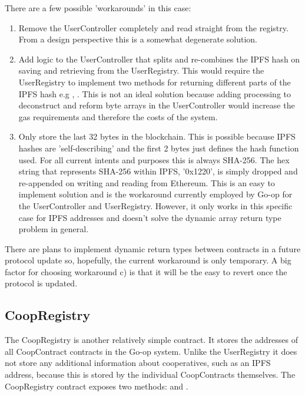 There are a few possible 'workarounds' in this case:\\

\begin{enumerate}[label=(\alph*)]
\item Remove the UserController completely and read straight from the registry. From a design perspective this is a somewhat degenerate solution. \\

\item Add logic to the UserController that splits and re-combines the IPFS hash on saving and retrieving from the UserRegistry. This would require the UserRegistry to implement two methods for returning different parts of the IPFS hash e.g , . This is not an ideal solution because adding processing to deconstruct and reform byte arrays in the UserController would increase the gas requirements and therefore the costs of the system. \\

\item Only store the last 32 bytes in the blockchain. This is possible because IPFS hashes are 'self-describing' and the first 2 bytes just defines the hash function used. For all current intents and purposes this is always SHA-256. The hex string that represents SHA-256 within IPFS, '0x1220', is simply dropped and re-appended on writing and reading from Ethereum. This is an easy to implement solution and is the workaround currently employed by Go-op for the UserController and UserRegistry. However, it only works in this specific case for IPFS addresses and doesn't solve the dynamic array return type problem in general.\\
\end{enumerate}

There are plans to implement dynamic return types between contracts in a future protocol update so, hopefully, the current workaround is only temporary\cite{ReturnArray}. A big factor for choosing workaround c) is that it will be the easy to revert once the protocol is updated.\\

\subsection{CoopRegistry}
\label{subsec:coopReg}
The CoopRegistry is another relatively simple contract. It stores the addresses of all CoopContract contracts in the Go-op system. Unlike the UserRegistry it does not store any additional information about cooperatives, such as an IPFS address, because this is stored by the individual CoopContracts themselves. The CoopRegistry contract exposes two methods:  and . \\

